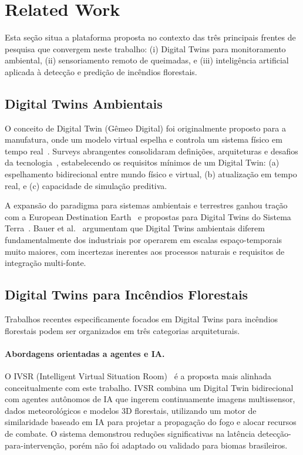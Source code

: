 \documentclass[preprint,times,numbers]{elsarticle}
\begin{document}
\section{Related Work}
\label{sec:related}

Esta seção situa a plataforma proposta no contexto das três principais frentes de pesquisa que convergem neste trabalho: (i) Digital Twins para monitoramento ambiental, (ii) sensoriamento remoto de queimadas, e (iii) inteligência artificial aplicada à detecção e predição de incêndios florestais.

\subsection{Digital Twins Ambientais}

O conceito de Digital Twin (Gêmeo Digital) foi originalmente proposto para a manufatura, onde um modelo virtual espelha e controla um sistema físico em tempo real~\cite{article:grieves2014,article:tao2019}. Surveys abrangentes consolidaram definições, arquiteturas e desafios da tecnologia~\cite{article:barricelli2019,article:rasheed2020,article:fuller2020,article:jones2020}, estabelecendo os requisitos mínimos de um Digital Twin: (a) espelhamento bidirecional entre mundo físico e virtual, (b) atualização em tempo real, e (c) capacidade de simulação preditiva.

A expansão do paradigma para sistemas ambientais e terrestres ganhou tração com a European Destination Earth~\cite{article:voosen2020} e propostas para Digital Twins do Sistema Terra~\cite{article:bauer2021nature,article:bauer2023natrev,article:nativi2021}. Bauer et al.~\cite{article:bauer2023natrev} argumentam que Digital Twins ambientais diferem fundamentalmente dos industriais por operarem em escalas espaço-temporais muito maiores, com incertezas inerentes aos processos naturais e requisitos de integração multi-fonte.

\subsection{Digital Twins para Incêndios Florestais}

Trabalhos recentes especificamente focados em Digital Twins para incêndios florestais podem ser organizados em três categorias arquiteturais.

\paragraph{Abordagens orientadas a agentes e IA.} O IVSR (Intelligent Virtual Situation Room)~\cite{article:morsali2026} é a proposta mais alinhada conceitualmente com este trabalho. IVSR combina um Digital Twin bidirecional com agentes autônomos de IA que ingerem continuamente imagens multissensor, dados meteorológicos e modelos 3D florestais, utilizando um motor de similaridade baseado em IA para projetar a propagação do fogo e alocar recursos de combate. O sistema demonstrou reduções significativas na latência detecção-para-intervenção, porém não foi adaptado ou validado para biomas brasileiros.
\end{document}
